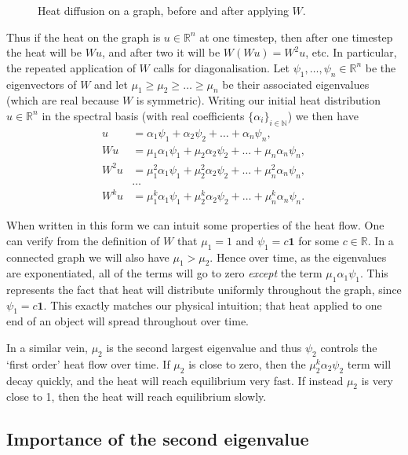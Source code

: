\documentclass[a4paper,11pt]{article}
\theoremstyle{definition}
\newcommand{\R}{\mathbb{R}}
\newcommand{\N}{\mathbb{N}}
\begin{document}
\begin{figure}
\centering
\def\svgwidth{0.99\textwidth}

\caption{Heat diffusion on a graph, before and after applying $W$.}\label{heat-transfer}
\end{figure}


Thus if the heat on the graph is $u \in \R^n$ at one timestep, then after one timestep the heat will be $Wu$, and after two it will be $W(Wu) = W^2u$, etc. In particular, the repeated application of $W$ calls for diagonalisation. Let $\psi_1, \dots, \psi_n \in \R^n$ be the eigenvectors of $W$ and let $\mu_1 \ge \mu_2 \ge \dots \ge \mu_n$ be their associated eigenvalues (which are real because $W$ is symmetric). Writing our initial heat distribution $u \in \R^n$ in the spectral basis (with real coefficients $\{\alpha_i\}_{i \in \N}$) we then have
\begin{align*}
u &= \alpha_1 \psi_1 + \alpha_2 \psi_2 + \dots + \alpha_n \psi_n, \\
Wu &= \mu_1 \alpha_1 \psi_1 + \mu_2 \alpha_2 \psi_2 + \dots + \mu_n \alpha_n \psi_n, \\
W^2u &= \mu_1^2 \alpha_1 \psi_1 + \mu_2^2 \alpha_2 \psi_2 + \dots + \mu_n^2 \alpha_n \psi_n, \\
&\dots \\
W^ku &= \mu_1^k \alpha_1 \psi_1 + \mu_2^k \alpha_2 \psi_2 + \dots + \mu_n^k \alpha_n \psi_n.
\end{align*}

When written in this form we can intuit some properties of the heat flow. One can verify from the definition of $W$ that $\mu_1 = 1$ and $\psi_1 = c\bm{1}$ for some $c \in \R$. In a connected graph we will also have $\mu_1 > \mu_2$. Hence over time, as the eigenvalues are exponentiated, all of the terms will go to zero \emph{except} the term $\mu_1 \alpha_1 \psi_1$. This represents the fact that heat will distribute uniformly throughout the graph, since $\psi_1 = c\bm{1}$. This exactly matches our physical intuition; that heat applied to one end of an object will spread throughout over time.

In a similar vein, $\mu_2$ is the second largest eigenvalue and thus $\psi_2$ controls the `first order' heat flow over time. If $\mu_2$ is close to zero, then the $\mu_2^k \alpha_2 \psi_2$ term will decay quickly, and the heat will reach equilibrium very fast. If instead $\mu_2$ is very close to 1, then the heat will reach equilibrium slowly.

\subsection{Importance of the second eigenvalue}
\end{document}
